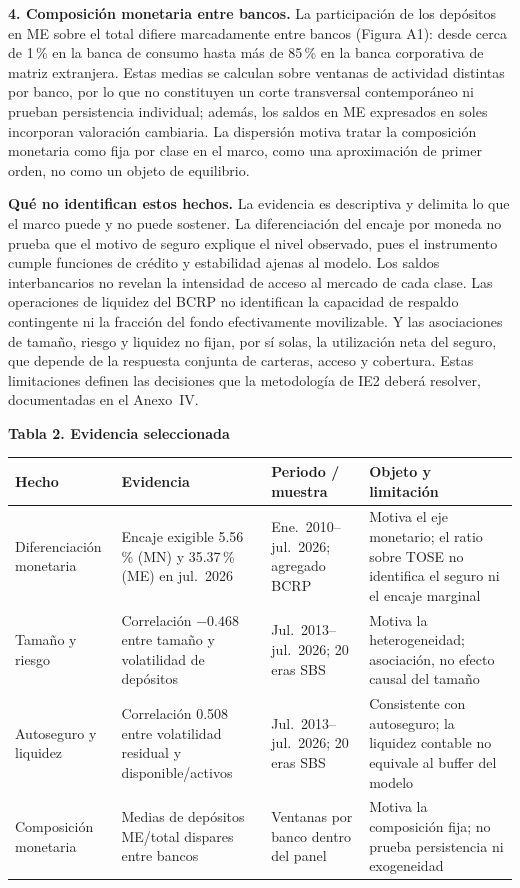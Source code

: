 \documentclass[11pt,a4paper]{article}
\begin{document}
\noindent\textbf{4. Composición monetaria entre bancos.} La participación de los depósitos en ME sobre el total difiere marcadamente entre bancos (Figura A1): desde cerca de 1\,\% en la banca de consumo hasta más de 85\,\% en la banca corporativa de matriz extranjera. Estas medias se calculan sobre ventanas de actividad distintas por banco, por lo que no constituyen un corte transversal contemporáneo ni prueban persistencia individual; además, los saldos en ME expresados en soles incorporan valoración cambiaria. La dispersión motiva tratar la composición monetaria como fija por clase en el marco, como una aproximación de primer orden, no como un objeto de equilibrio.

\noindent\textbf{Qué no identifican estos hechos.} La evidencia es descriptiva y delimita lo que el marco puede y no puede sostener. La diferenciación del encaje por moneda no prueba que el motivo de seguro explique el nivel observado, pues el instrumento cumple funciones de crédito y estabilidad ajenas al modelo. Los saldos interbancarios no revelan la intensidad de acceso al mercado de cada clase. Las operaciones de liquidez del BCRP no identifican la capacidad de respaldo contingente ni la fracción del fondo efectivamente movilizable. Y las asociaciones de tamaño, riesgo y liquidez no fijan, por sí solas, la utilización neta del seguro, que depende de la respuesta conjunta de carteras, acceso y cobertura. Estas limitaciones definen las decisiones que la metodología de IE2 deberá resolver, documentadas en el Anexo~IV.

\vspace{0.4cm}
\noindent\textbf{Tabla 2. Evidencia seleccionada}\label{tab:evidencia}
\vspace{0.15cm}

\renewcommand{\arraystretch}{1.3}
\noindent\begin{tabular}{@{}p{2.3cm}p{3.7cm}p{2.9cm}p{3.9cm}@{}}
\toprule
\textbf{Hecho} & \textbf{Evidencia} & \textbf{Periodo / muestra} & \textbf{Objeto y limitación}\\
\midrule
Diferenciación monetaria & Encaje exigible 5.56\,\% (MN) y 35.37\,\% (ME) en jul.~2026 & Ene.~2010--jul.~2026; agregado BCRP & Motiva el eje monetario; el ratio sobre TOSE no identifica el seguro ni el encaje marginal\\
Tamaño y riesgo & Correlación $-0.468$ entre tamaño y volatilidad de depósitos & Jul.~2013--jul.~2026; 20 eras SBS & Motiva la heterogeneidad; asociación, no efecto causal del tamaño\\
Autoseguro y liquidez & Correlación 0.508 entre volatilidad residual y disponible/activos & Jul.~2013--jul.~2026; 20 eras SBS & Consistente con autoseguro; la liquidez contable no equivale al buffer del modelo\\
Composición monetaria & Medias de depósitos ME/total dispares entre bancos & Ventanas por banco dentro del panel & Motiva la composición fija; no prueba persistencia ni exogeneidad\\
\bottomrule
\end{tabular}
\end{document}
